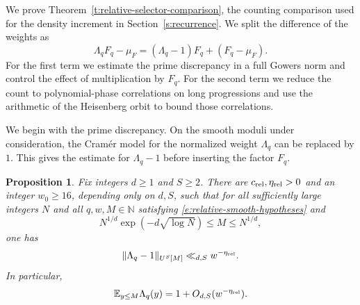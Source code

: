 \documentclass[12pt]{amsart}
\newcommand{\1}{\mathbf 1}
\newtheorem{proposition}[theorem]{Proposition}
\theoremstyle{definition}
\begin{document}
We prove Theorem~\ref{t:relative-selector-comparison}, the counting
comparison used for the density increment in
Section~\ref{s:recurrence}. We split the difference of the weights as
\[
 \Lambda_qF_q-\mu_F=(\Lambda_q-1)F_q+(F_q-\mu_F).
\]
For the first term we estimate the prime discrepancy in a full
Gowers norm and control the effect of multiplication by \(F_q\).
For the second term we reduce the count to polynomial-phase
correlations on long progressions and use the arithmetic of the
Heisenberg orbit to bound those correlations.

We begin with the prime discrepancy. On the smooth moduli under
consideration, the Cram\'er model for the normalized weight
\(\Lambda_q\) can be replaced by \(1\).
This gives the estimate for \(\Lambda_q-1\) before inserting the
factor \(F_q\).

\begin{proposition}\label{p:high-order-relative-prime}
Fix integers $d\geq1$ and $S\geq2$. There are
$c_{\rm rel},\eta_{\rm rel}>0$ and an integer $w_0\geq16$,
depending only on $d,S$, such that for all sufficiently large
integers $N$ and all $q,w,M\in\mathbb N$ satisfying
\eqref{e:relative-smooth-hypotheses} and
\begin{equation}\label{e:relative-scale-window}
 N^{1/d}\exp(-d\sqrt{\log N})\leq M\leq N^{1/d},
\end{equation}
one has
\begin{equation}\label{e:high-order-relative-prime}
 \|\Lambda_q-1\|_{U^S[M]}\ll_{d,S}w^{-\eta_{\rm rel}}.
\end{equation}
In particular,
\begin{equation}\label{e:relative-first-moment}
 \mathbb E_{y\leq M}\Lambda_q(y)
 =1+O_{d,S}(w^{-\eta_{\rm rel}}).
\end{equation}
\end{proposition}
\end{document}
